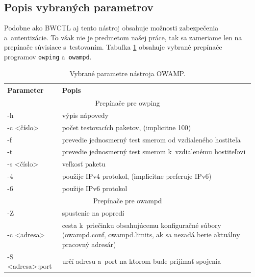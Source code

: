         \subsection{Popis vybraných parametrov} \label{owamp_param}
        Podobne ako BWCTL aj tento nástroj obsahuje možnosti zabezpečenia
        a~autentizácie. To však nie je predmetom našej práce, tak sa zameriame 
        len na prepínače súvisiace s~testovaním. Tabuľka 
        \ref{tab_owamp_parametre} obsahuje vybrané prepínače programov
        \texttt{owping} a~\texttt{owampd}.

        \begin{table}[H]
            \begin{center}
                \begin{tabular}{|l|p{11cm}|}
                    \hline
                     \textbf{Parameter}  &  \textbf{Popis}  \\
                    \hline
                    \multicolumn{2}{|c|}{Prepínače pre owping} \\
                    \hline
                    -h      &  výpis nápovedy \\ 
                    -c \textless číslo\textgreater & 
                    počet testovacích paketov, (implicitne 100)   \\
                    -f      &  prevedie jednosmerný test smerom od vzdialeného
                                hostiteľa \\ 
                    -t      &  prevedie jednosmerný test smerom k~vzdialenému
                                hostiteľovi \\ 
                    -s \textless číslo\textgreater & veľkosť paketu\\
                    -4      &  použije IPv4 protokol, (implicitne
                                preferuje IPv6) \\ 
                    -6      &  použije IPv6 protokol \\ 
                    \hline
                    \multicolumn{2}{|c|}{Prepínače pre owampd} \\
                    \hline
                    -Z      &  spustenie na popredí \\ 
                    -c \textless adresa\textgreater  &  
                        cesta k~priečinku obsahujúcemu 
                        konfiguračné súbory (owampd.conf, owampd.limits,
                        ak sa nezadá berie aktuálny pracovný adresár)\\ 
                    -S \textless adresa\textgreater:port & určí
                        adresu a~port na ktorom bude prijímať spojenia\\
                    \hline
                \end{tabular}
                \caption{Vybrané parametre nástroja OWAMP.} 
                \label{tab_owamp_parametre}
            \end{center}
        \end{table}

